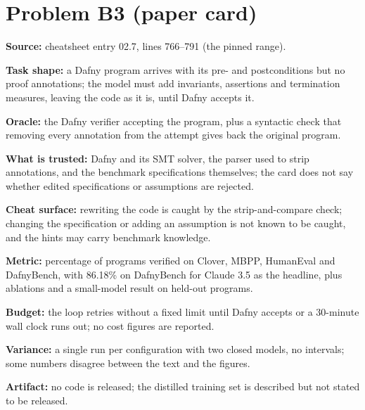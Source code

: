 \documentclass[11pt]{article}
\begin{document}
\section*{Problem B3 (paper card)}\label{ans:B3}
\begin{answer}
\textbf{Source:} cheatsheet entry 02.7, lines 766--791 (the pinned range).

\textbf{Task shape:} a Dafny program arrives with its pre- and postconditions
but no proof annotations; the model must add invariants, assertions and
termination measures, leaving the code as it is, until Dafny accepts it.

\textbf{Oracle:} the Dafny verifier accepting the program, plus a syntactic
check that removing every annotation from the attempt gives back the original
program.

\textbf{What is trusted:} Dafny and its SMT solver, the parser used to strip
annotations, and the benchmark specifications themselves; the card does not
say whether edited specifications or assumptions are rejected.

\textbf{Cheat surface:} rewriting the code is caught by the strip-and-compare
check; changing the specification or adding an assumption is not known to be
caught, and the hints may carry benchmark knowledge.

\textbf{Metric:} percentage of programs verified on Clover, MBPP, HumanEval and
DafnyBench, with 86.18\% on DafnyBench for Claude 3.5 as the headline, plus
ablations and a small-model result on held-out programs.

\textbf{Budget:} the loop retries without a fixed limit until Dafny accepts or a
30-minute wall clock runs out; no cost figures are reported.

\textbf{Variance:} a single run per configuration with two closed models, no
intervals; some numbers disagree between the text and the figures.

\textbf{Artifact:} no code is released; the distilled training set is
described but not stated to be released.
\end{answer}
\end{document}
